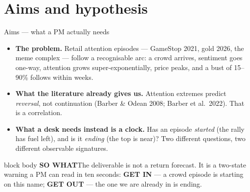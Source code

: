 \documentclass[aspectratio=169,11pt]{beamer}
\newcommand{\sowhatfont}{\footnotesize}
\newcommand{\sowhat}[1]{%
  \vspace{0.3em}
  \begin{beamercolorbox}[wd=\linewidth,sep=0.55em]{block body}
    {\sowhatfont\textbf{\color{gicnavy}SO WHAT}\quad #1}
  \end{beamercolorbox}}
\begin{document}
\section{Aims and hypothesis}
\begin{frame}{Aims --- what a PM actually needs}
  \begin{itemize}
    \item \textbf{The problem.} Retail attention episodes --- GameStop 2021,
      gold 2026, the meme complex --- follow a recognisable arc: a crowd
      arrives, sentiment goes one-way, attention grows super-exponentially,
      price peaks, and a bust of 15--90\% follows within weeks.
    \item \textbf{What the literature already gives us.} Attention extremes
      predict \emph{reversal}, not continuation (Barber \& Odean 2008; Barber
      et al.\ 2022). That is a correlation.
    \item \textbf{What a desk needs instead is a clock.} Has an episode
      \emph{started} (the rally has fuel left), and is it \emph{ending} (the
      top is near)? Two different questions, two different observable
      signatures.
  \end{itemize}
  \sowhat{The deliverable is not a return forecast. It is a two-state warning
    a PM can read in ten seconds: \textbf{\color{bullish}GET IN} --- a crowd
    episode is starting on this name; \textbf{\color{bearish}GET OUT} --- the
    one we are already in is ending.}
\end{frame}
\end{document}
